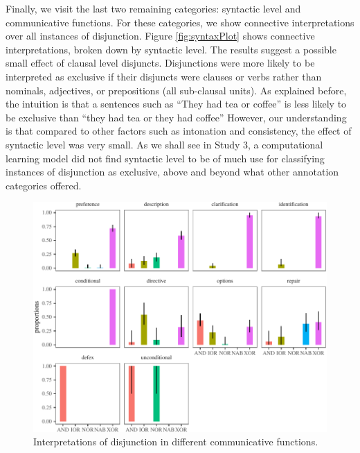 \documentclass[,man,floatsintext]{apa6}
\begin{document}
Finally, we visit the last two remaining categories: syntactic level and communicative functions. For these categories, we show connective interpretations over all instances of disjunction. Figure \ref{fig:syntaxPlot} shows connective interpretations, broken down by syntactic level. The results suggest a possible small effect of clausal level disjuncts. Disjunctions were more likely to be interpreted as exclusive if their disjuncts were clauses or verbs rather than nominals, adjectives, or prepositions (all sub-clausal units). As explained before, the intuition is that a sentences such as \enquote{They had tea or coffee} is less likely to be exclusive than \enquote{they had tea or they had coffee} However, our understanding is that compared to other factors such as intonation and consistency, the effect of syntactic level was very small. As we shall see in Study 3, a computational learning model did not find syntactic level to be of much use for classifying instances of disjunction as exclusive, above and beyond what other annotation categories offered.

\begin{figure}[tb]

{\centering \includegraphics{figs/speechActPlot-1} 

}

\caption{Interpretations of disjunction in different communicative functions.}\label{fig:speechActPlot}
\end{figure}
\end{document}
